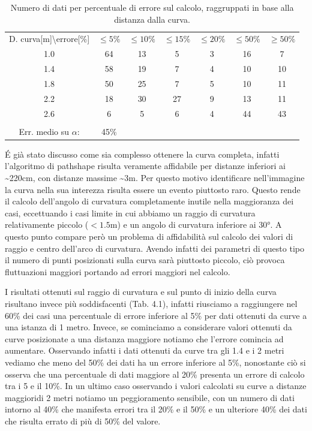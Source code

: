     \begin{table}[h]
        \centering
        \begin{tabular}{ccccccc}
            D. curva[m]\textbackslash errore[\%]    & $\le 5\%$   & $\le 10\%$  & $\le 15\%$  & $\le 20\%$  & $\le 50\%$  & $\ge 50\%$ \\
            1.0     & 64    & 13    &  5    & 3     & 16    &  7 \\
            1.4     & 58    & 19    &  7    & 4     & 10    & 10 \\
            1.8	    & 50    & 25    &  7    & 5     & 10    & 11 \\
            2.2     & 18    & 30    & 27    & 9     & 13    & 11 \\
            2.6     &  6    &  5    &  6    & 4     & 44    & 43 \\
            \\
            Err. medio su $\alpha$: & 45\% \\
        \end{tabular}
        \caption{Numero di dati per percentuale di errore sul calcolo, raggruppati in base alla distanza dalla curva.}
    \end{table}

    \'E già stato discusso come sia complesso ottenere la curva completa, infatti l'algoritmo di pathshape risulta veramente affidabile per distanze inferiori ai \textasciitilde 220cm, con distanze massime \textasciitilde 3m. Per questo motivo identificare nell'immagine la curva nella sua interezza risulta essere un evento piuttosto raro. Questo rende il calcolo dell'angolo di curvatura completamente inutile nella maggioranza dei casi, eccettuando i casi limite in cui abbiamo un raggio di curvatura relativamente piccolo ($<1.5$m) e un angolo di curvatura inferiore ai 30°. A questo punto compare però un problema di affidabilità sul calcolo dei valori di raggio e centro dell'arco di curvatura. Avendo infatti dei parametri di questo tipo il numero di punti posizionati sulla curva sarà piuttosto piccolo, ciò provoca fluttuazioni maggiori portando ad errori maggiori nel calcolo.

    I risultati ottenuti sul raggio di curvatura e sul punto di inizio della curva risultano invece più soddisfacenti (Tab. 4.1), infatti riusciamo a raggiungere nel 60\% dei casi una percentuale di errore inferiore al 5\% per dati ottenuti da curve a una istanza di 1 metro. Invece, se cominciamo a considerare valori ottenuti da curve posizionate a una distanza maggiore notiamo che l'errore comincia ad aumentare. Osservando infatti i dati ottenuti da curve tra gli 1.4 e i 2 metri vediamo che meno del 50\% dei dati ha un errore inferiore al 5\%, nonostante ciò si osserva che una percentuale di dati maggiore al 20\% presenta un errore di calcolo tra i 5 e il 10\%. In un ultimo caso osservando i valori calcolati su curve a distanze maggioridi 2 metri notiamo un peggioramento sensibile, con un numero di dati intorno al 40\% che manifesta errori tra il 20\% e il 50\% e un ulteriore 40\% dei dati che risulta errato di più di 50\% del valore.

